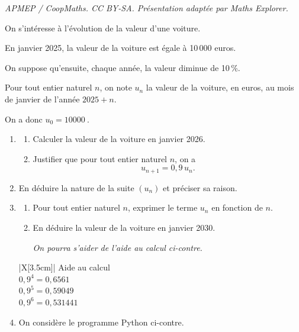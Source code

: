 \documentclass[10pt]{article}
\providecommand{\np}[2][]{{#2~#1}}
\begin{document}
\noindent\textit{APMEP / CoopMaths. CC BY-SA. Présentation adaptée par Maths Explorer.}\par\medskip
On s'intéresse à l'évolution de la valeur d'une voiture.

En janvier 2025, la valeur de la voiture est égale à 10\,000 euros.

On suppose qu'ensuite, chaque année, la valeur diminue de 10\,\%.

Pour tout entier naturel $n$, on note $u_n$ la valeur de la voiture, en euros, au mois de janvier de l'année $2025 + n$.

On a donc $u_0 = \np{10000}$.

\begin{enumerate}
	\item \begin{enumerate}
		\item Calculer la valeur de la voiture en janvier 2026.
		\item Justifier que pour tout entier naturel $n$, on a
		\[u_{n+1} = 0,9\, u_n.\]
	\end{enumerate}

	\item En déduire la nature de la suite $(u_n)$ et préciser sa raison.

	\item \begin{minipage}[t]{0.75\linewidth}
		\begin{enumerate}
			\item Pour tout entier naturel $n$, exprimer le terme $u_n$ en fonction de $n$.

			\item En déduire la valeur de la voiture en janvier 2030.

			\emph{On pourra s'aider de l'aide au calcul ci-contre.}
		\end{enumerate}
	\end{minipage}
	\hfill
	\begin{tblr}[t]{|X[3.5cm]|}\hline
		Aide au calcul\\
		$0,9^4 = 0,6561$\\
		$0,9^5 = 0,59049$\\
		$0,9^6 = 0,531441$\\ \hline
	\end{tblr}

	\item \begin{minipage}[t]{0.62\linewidth}
		On considère le programme Python ci-contre.


\end{minipage}
\end{enumerate}
\end{document}
